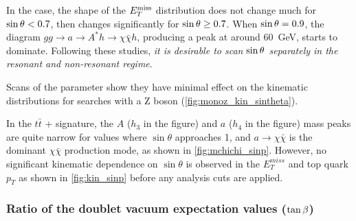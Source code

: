 In the \monohbb case, the shape of the $E_T^\mathrm{miss}$ distribution does not change much  for $\sin\theta < 0.7$, then changes significantly for $\sin\theta\geq 0.7$. 
When $\sin\theta=0.9$, the diagram $gg\rightarrow a\rightarrow A^*h \rightarrow \chi \bar{\chi} h$, producing a \MET peak at around 60~GeV, starts to dominate.
Following these studies, \emph{it is desirable to scan $\sin\theta$ separately in the resonant and non-resonant regime}. 

Scans of the \sinp parameter show they have minimal effect on the kinematic distributions for searches with a Z boson (\autoref{fig:monoz_kin_sintheta}). 

In the $t\bar{t}$ + \MET signature, the $A$ ($h_{3}$ in the figure) and $a$  ($h_{4}$ in the figure) mass peaks are quite narrow for values where $\sin\theta$ approaches 1, and $a\rightarrow\chi\bar{\chi}$ is the dominant $\chi\bar{\chi}$ production mode, as shown in \autoref{fig:mchichi_sinp}. 
However, no significant kinematic dependence on $\sin\theta$ is observed in the $E_{T}^{miss}$ and top quark $p_{T}$ as shown in \autoref{fig:kin_sinp} before any analysis cuts are applied.

\subsubsection{Ratio of the doublet vacuum expectation values ($\tan\beta$)}

